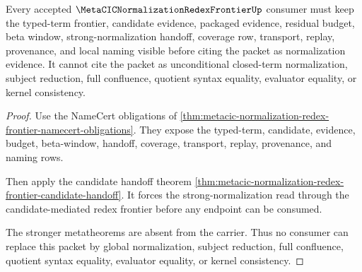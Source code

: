 \begin{theorem}
\label{thm:metacic-normalization-redex-frontier-nonescape}
Every accepted $\MetaCICNormalizationRedexFrontierUp$ consumer must keep the typed-term frontier, candidate evidence, packaged evidence, residual budget, beta window, strong-normalization handoff, coverage row, transport, replay, provenance, and local naming visible before citing the packet as normalization evidence. It cannot cite the packet as unconditional closed-term normalization, subject reduction, full confluence, quotient syntax equality, evaluator equality, or kernel consistency.
\end{theorem}
\begin{proof}
Use the NameCert obligations of \autoref{thm:metacic-normalization-redex-frontier-namecert-obligations}. They expose the typed-term, candidate, evidence, budget, beta-window, handoff, coverage, transport, replay, provenance, and naming rows.

Then apply the candidate handoff theorem \autoref{thm:metacic-normalization-redex-frontier-candidate-handoff}. It forces the strong-normalization read through the candidate-mediated redex frontier before any endpoint can be consumed.

The stronger metatheorems are absent from the carrier. Thus no consumer can replace this packet by global normalization, subject reduction, full confluence, quotient syntax equality, evaluator equality, or kernel consistency.
\end{proof}



